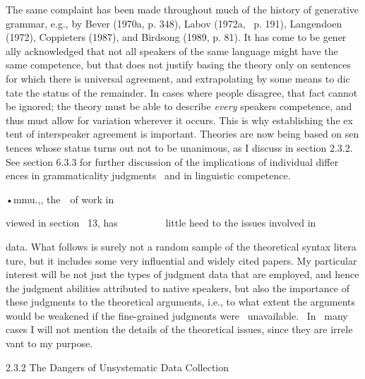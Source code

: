 \begin{styleStandard}
The same complaint has been made throughout much of the history of generative grammar, e.g., by Bever (1970a, p. 348), Labov (1972a, \ p. 191), Langendoen (1972), Coppieters (1987), and Birdsong (1989, p. 81). It has come to be gener\- ally acknowledged that not all speakers of {\textquotedbl}the same language{\textquotedbl} might have the same competence, but that does not justify basing the theory only on sentences for which there is universal agreement, and extrapolating by some means to dic\- tate the status of the remainder. In cases where people disagree, that fact cannot be ignored; the theory must be able to describe \textit{every}\textit{ }speaker{\textquotesingle}s competence, and thus must allow for variation wherever it occurs. This is why establishing the ex\- tent of interspeaker agreement is important. Theories are now being based on sen\- tences whose status turns out not to be unanimous, as I discuss in section 2.3.2. See section 6.3.3 for further discussion of the implications of individual differ\- ences in grammaticality judgments \ and in linguistic competence.
\end{styleStandard}


\begin{styleStandard}
•mmu.,, the\ \ of work in
\end{styleStandard}


\begin{styleStandard}
viewed in section \ 13, has \ \ \ \ \ \ \ \ \ little heed to the issues involved in
\end{styleStandard}


\begin{styleStandard}
data. What follows is surely not a random sample of the theoretical syntax litera\- ture, but it includes some very influential and widely cited papers. My particular interest will be not just the types of judgment data that are employed, and hence the judgment abilities attributed to native speakers, but also the importance of these judgments to the theoretical arguments, i.e., to what extent the arguments would be weakened if the fine-grained judgments were \ unavailable. \ In \ many cases I will not mention the details of the theoretical issues, since they are irrele\- vant to my purpose.
\end{styleStandard}


\clearpage\setcounter{page}{1}\begin{styleHeadingvi}
2.3.2 The Dangers of Unsystematic Data Collection
\end{styleHeadingvi}


